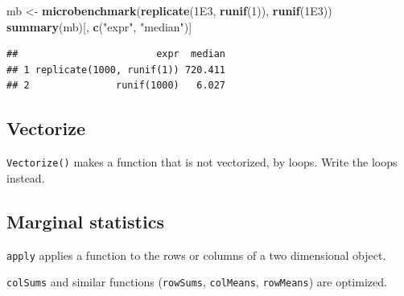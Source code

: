 \documentclass[
  12pt,
  american,
  a4paper,
  extrafontsizes,onecolumn,openright
  ]{memoir}
\newenvironment{Shaded}{\begin{snugshade}}{\end{snugshade}}
\newcommand{\DecValTok}[1]{\textcolor[rgb]{0.00,0.00,0.81}{#1}}
\newcommand{\FloatTok}[1]{\textcolor[rgb]{0.00,0.00,0.81}{#1}}
\newcommand{\FunctionTok}[1]{\textcolor[rgb]{0.13,0.29,0.53}{\textbf{#1}}}
\newcommand{\NormalTok}[1]{#1}
\newcommand{\OtherTok}[1]{\textcolor[rgb]{0.56,0.35,0.01}{#1}}
\newcommand{\StringTok}[1]{\textcolor[rgb]{0.31,0.60,0.02}{#1}}
\begin{document}
\scriptsize

\begin{Shaded}
\begin{Highlighting}[]
\NormalTok{mb }\OtherTok{\textless{}{-}} \FunctionTok{microbenchmark}\NormalTok{(}\FunctionTok{replicate}\NormalTok{(}\FloatTok{1E3}\NormalTok{, }\FunctionTok{runif}\NormalTok{(}\DecValTok{1}\NormalTok{)), }\FunctionTok{runif}\NormalTok{(}\FloatTok{1E3}\NormalTok{))}
\FunctionTok{summary}\NormalTok{(mb)[, }\FunctionTok{c}\NormalTok{(}\StringTok{"expr"}\NormalTok{, }\StringTok{"median"}\NormalTok{)]}
\end{Highlighting}
\end{Shaded}

\begin{verbatim}
##                        expr  median
## 1 replicate(1000, runif(1)) 720.411
## 2               runif(1000)   6.027
\end{verbatim}

\normalsize

\subsection{Vectorize}\label{vectorize}

\texttt{Vectorize()} makes a function that is not vectorized, by loops.
Write the loops instead.

\subsection{Marginal statistics}\label{marginal-statistics}

\texttt{apply} applies a function to the rows or columns of a two dimensional object.

\texttt{colSums} and similar functions (\texttt{rowSums}, \texttt{colMeans}, \texttt{rowMeans}) are optimized.

\scriptsize
\end{document}

